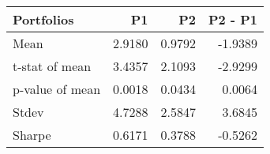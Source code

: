 \begin{tabular}{lrrr}
\toprule
Portfolios & P1 & P2 & P2 - P1 \\
\midrule
Mean & 2.9180 & 0.9792 & -1.9389 \\
t-stat of mean & 3.4357 & 2.1093 & -2.9299 \\
p-value of mean & 0.0018 & 0.0434 & 0.0064 \\
Stdev & 4.7288 & 2.5847 & 3.6845 \\
Sharpe & 0.6171 & 0.3788 & -0.5262 \\
\bottomrule
\end{tabular}
